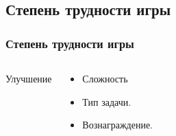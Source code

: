 \documentclass[10pt]{beamer}
\begin{document}
\subsection{Степень трудности игры}
\begin{frame}
\frametitle{Степень трудности игры}

\begin{columns}[c]

\begin{center}
  Улучшение
\end{center}

\begin{block}{}

\begin{itemize}
  \item Сложность
  \item Тип задачи.
  \item Вознаграждение.
\end{itemize}

\end{block}
\end{columns}
\end{frame}
\end{document}
